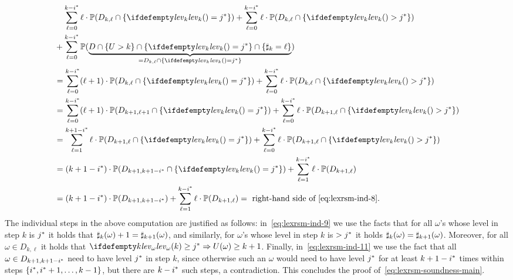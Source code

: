 \begin{align}
&\phantom{+}\;\sum_{\ell=0}^{k-\fixn{i}} \ell\cdot\probm(D_{k,\ell} \cap \{\levelrank{}{k}=\fixn{j}\}) + \sum_{\ell=0}^{k-\fixn{i}} \ell\cdot\probm(D_{k,\ell}\cap \{\levelrank{}{k}>\fixn{j}\} )\nonumber \\ 
&+\sum_{\ell=0}^{k-\fixn{i}}\probm(\underbrace{D \cap \{U>k\} \cap \{\levelrank{}{k} = \fixn{j}\} \cap \{\noofdec_k = \ell\}}_{=D_{k,\ell} \cap \{\levelrank{}{k} = \fixn{j}\}})
\nonumber \\
&= \sum_{\ell=0}^{k-\fixn{i}}(\ell+1) \cdot\probm(D_{k,\ell}\cap \{\levelrank{}{k} = \fixn{j}\}) +  \sum_{\ell=0}^{k-\fixn{i}} \ell\cdot\probm(D_{k,\ell}\cap \{\levelrank{}{k}>\fixn{j}\} ) \nonumber\\
&=\sum_{\ell=0}^{k-\fixn{i}} (\ell+1)\cdot \probm{(D_{k+1,\ell+1} \cap \{\levelrank{}{k} = \fixn{j}\})} +  \sum_{\ell=0}^{k-\fixn{i}} \ell\cdot\probm(D_{k+1,\ell}\cap \{\levelrank{}{k}>\fixn{j}\} ) \label{eq:lexrsm-ind-9}\\
&= \sum_{\ell=1}^{k+1-\fixn{i}} \ell\cdot \probm{(D_{k+1,\ell} \cap \{\levelrank{}{k} = \fixn{j}\})} +  \sum_{\ell=0}^{k-\fixn{i}} \ell\cdot\probm(D_{k+1,\ell}\cap \{\levelrank{}{k}>\fixn{j}\} )
\nonumber \\
&= (k+1-\fixn{i})\cdot \probm{(D_{k+1,k+1-\fixn{i}}\cap\{\levelrank{}{k} =\fixn{j} \} )} + \sum_{\ell=1}^{k-\fixn{i}} \ell \cdot \probm(D_{k+1,\ell})  \nonumber\\
&= (k+1-\fixn{i})\cdot\probm(D_{k+1,k+1-\fixn{i}}) + \sum_{\ell=1}^{k-\fixn{i}}\ell\cdot\probm(D_{k+1,\ell}) = \text{ right-hand side of~\eqref{eq:lexrsm-ind-8}} \label{eq:lexrsm-ind-11}.
\end{align}
The individual steps in the above computation are justified as follows: 
in~\eqref{eq:lexrsm-ind-9} we use the facts that for all $\omega$'s whose level 
in step $k$ is ${j}^*$ it holds that 
$\sharp_k(\omega)+1=\sharp_{k+1}(\omega)$, and similarly, for $\omega$'s 
whose level in step $k$ is $>{j}^*$ it holds 
$\sharp_k(\omega)=\sharp_{k+1}(\omega)$. Moreover, for all $\omega\in 
D_{k,\ell}$ it holds that $\levelrank{k}{\omega}\geq \fixn{j} \Rightarrow 
U(\omega)\geq k+1$. Finally, in~\eqref{eq:lexrsm-ind-11} we use the fact that 
all $\omega\in D_{k+1,k+1-{i}^*}$ need to have level ${j}^*$ in step $k$, 
since otherwise such an $\omega$ would need to have level ${j}^*$ for at 
least $k+1-{i}^*$ times within steps $\{{i}^*,{i}^*+1,\dots,k-1\}$, 
but there are $k-{i}^*$ such steps, a contradiction. This concludes the 
proof of~\eqref{eq:lexrsm-soundness-main}.

